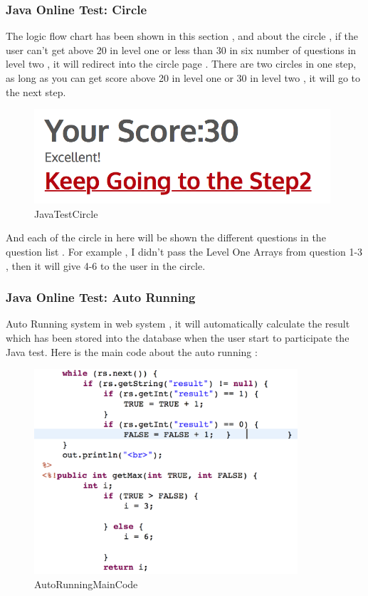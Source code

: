 \documentclass[12pt]{article}
\begin{document}
\subsubsection{Java Online Test: Circle}
	The logic flow chart has been shown in this section , and about the circle ,  if the user can't get above 20 in level one or less than 30 in six number of questions in level two , it will redirect into the circle page . There are two circles in one step, as long as you can get score above 20 in level one or 30 in level two , it will go to the next step.  
\begin{figure}[H]
	\centering	

\includegraphics[width=11cm]{images/JavaTestCircle.jpg}

	\caption[JavaTestCircle]{JavaTestCircle}
	\label{JavaTestCircle}
\end{figure}
	And each of the circle in here will be shown the different questions in the question list . For example , I didn't pass the Level One Arrays from question 1-3 , then it will give 4-6 to the user in the circle. 
	
\subsubsection{Java Online Test: Auto Running}
Auto Running system in web system , it will automatically calculate the result which has been stored into the database when the user start to participate the Java test. Here is the main code about the auto running :
\begin{figure}[H]
	\centering	

	\includegraphics[height=3in]{images/AutoRunningMainCode.jpg}

	\caption[AutoRunningMainCode]{AutoRunningMainCode}
	\label{AutoRunningMainCode}
\end{figure}
\end{document}
